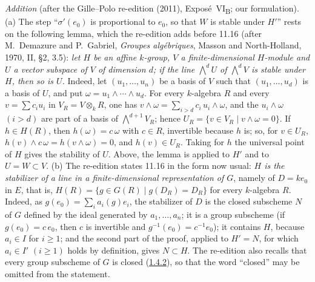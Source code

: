 \par\medskip\noindent
\emph{Addition} (after the Gille--Polo re-edition (2011), Expos\'e~VI\textsubscript{B}; our formulation).
(a) The step ``\(\sigma'(e_0)\) is proportional to \(e_0\), so that \(W\) is stable under \(H'\)'' rests on the
following lemma, which the re-edition adds before 11.16 (after M.~Demazure and P.~Gabriel, \emph{Groupes
alg\'ebriques}, Masson and North-Holland, 1970, II, \S2, 3.5): \emph{let \(H\) be an affine \(k\)-group, \(V\) a
finite-dimensional \(H\)-module and \(U\) a vector subspace of \(V\) of dimension \(d\); if the line
\(\bigwedge^dU\) of \(\bigwedge^dV\) is stable under \(H\), then so is \(U\).} Indeed, let \((u_1,\ldots,u_n)\) be a
basis of \(V\) such that \((u_1,\ldots,u_d)\) is a basis of \(U\), and put \(\omega=u_1\wedge\cdots\wedge u_d\). For
every \(k\)-algebra \(R\) and every \(v=\sum c_iu_i\) in \(V_R=V\otimes_kR\), one has
\(v\wedge\omega=\sum_{i>d}c_i\,u_i\wedge\omega\), and the \(u_i\wedge\omega\) \((i>d)\) are part of a basis of
\(\bigwedge^{d+1}V_R\); hence \(U_R=\{v\in V_R\mid v\wedge\omega=0\}\). If \(h\in H(R)\), then \(h(\omega)=c\,\omega\)
with \(c\in R\), invertible because \(h\) is; so, for \(v\in U_R\), \(h(v)\wedge c\,\omega=h(v\wedge\omega)=0\), and
\(h(v)\in U_R\). Taking for \(h\) the universal point of \(H\) gives the stability of \(U\). Above, the lemma is
applied to \(H'\) and to \(U=W\subset V\).
(b) The re-edition states 11.16 in the form now usual: \emph{\(H\) is the stabilizer of a line in a
finite-dimensional representation of \(G\)}, namely of \(D=ke_0\) in \(E\), that is,
\(H(R)=\{g\in G(R)\mid g(D_R)=D_R\}\) for every \(k\)-algebra \(R\). Indeed, as \(g(e_0)=\sum_ia_i(g)e_i\), the
stabilizer of \(D\) is the closed subscheme \(N\) of \(G\) defined by the ideal generated by \(a_1,\ldots,a_n\); it is
a group subscheme (if \(g(e_0)=c\,e_0\), then \(c\) is invertible and \(g^{-1}(e_0)=c^{-1}e_0\)); it contains \(H\),
because \(a_i\in I\) for \(i\geq1\); and the second part of the proof, applied to \(H'=N\), for which \(a_i\in I'\)
\((i\geq1)\) holds by definition, gives \(N\subset H\). The re-edition also recalls that every group subscheme of
\(G\) is closed (\hyperref[cor:sga3-VIB-1.4.2]{1.4.2}), so that the word ``closed'' may be omitted from the
statement.
